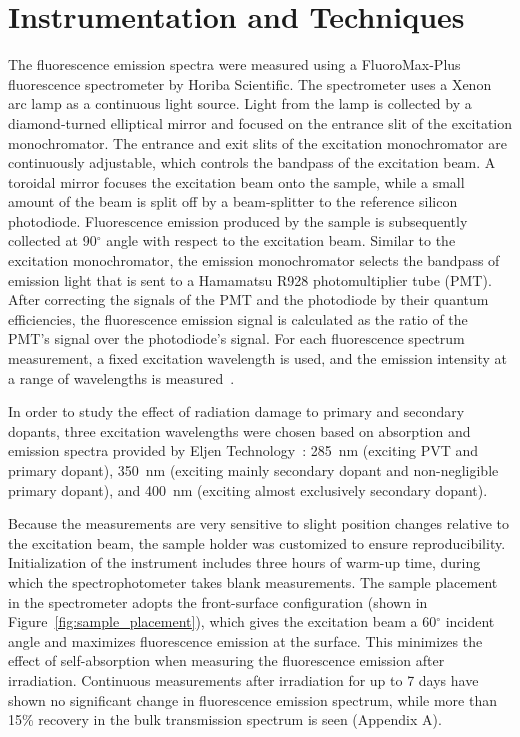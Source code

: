 \documentclass[preprint]{elsarticle}
\begin{document}
\section{Instrumentation and Techniques}
The fluorescence emission spectra were measured using a FluoroMax-Plus fluorescence spectrometer by Horiba Scientific. 
The spectrometer uses a Xenon arc lamp as a continuous light source. 
Light from the lamp is collected by a diamond-turned elliptical mirror and focused on the entrance slit of the excitation monochromator.
The entrance and exit slits of the excitation monochromator are continuously adjustable, 
which controls the bandpass of the excitation beam. 
A toroidal mirror focuses the excitation beam onto the sample, while a small amount of the beam is split off by a beam-splitter 
to the reference silicon photodiode. 
Fluorescence emission produced by the sample is subsequently collected at 90$^\circ$ angle with respect to the excitation beam. 
Similar to the excitation monochromator, the emission monochromator selects the bandpass of emission light that is sent to 
a Hamamatsu R928 photomultiplier tube (PMT). 
After correcting the signals of the PMT and the photodiode by their quantum efficiencies, 
the fluorescence emission signal is calculated as the ratio of the PMT's signal over the photodiode's signal. 
For each fluorescence spectrum measurement, a fixed excitation wavelength is used, 
and the emission intensity at a range of wavelengths is measured~\cite{horiba}. 

In order to study the effect of radiation damage to primary and secondary dopants, three excitation wavelengths were chosen based on 
absorption and emission spectra provided by Eljen Technology~\cite{chuck}: 
285~nm (exciting PVT and primary dopant), 
350~nm (exciting mainly secondary dopant and non-negligible primary dopant),
and 400~nm (exciting almost exclusively secondary dopant).

Because the measurements are very sensitive to slight position changes relative to the excitation beam, 
the sample holder was customized to ensure reproducibility. 
Initialization of the instrument includes three hours of warm-up time, during which the spectrophotometer takes blank measurements. 
The sample placement in the spectrometer adopts the front-surface configuration (shown in Figure~\ref{fig:sample_placement}), 
which gives the excitation beam a 60$^\circ$ incident angle and maximizes fluorescence emission at the surface. 
This minimizes the effect of self-absorption when measuring the fluorescence emission after irradiation. 
Continuous measurements after irradiation for up to 7 days have shown no significant change in fluorescence emission spectrum, 
while more than 15\% recovery in the bulk transmission spectrum is seen (Appendix A).
\end{document}
